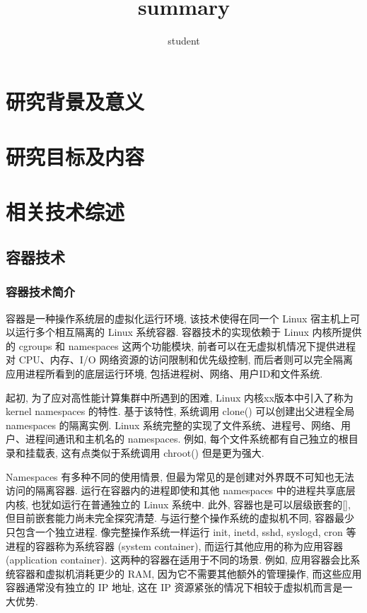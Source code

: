\documentclass[UTF8,a4paper]{ctexart}
\begin{document}
\title{summary}
\date{\vspace{-5ex}}
\author{student}
\maketitle
\thispagestyle{empty}
\newpage

\tableofcontents
\setcounter{page}{0}
\thispagestyle{empty}
\newpage

\section{研究背景及意义}

\section{研究目标及内容}

\section{相关技术综述}
\subsection{容器技术}
\subsubsection{容器技术简介}
容器是一种操作系统层的虚拟化运行环境, 该技术使得在同一个 Linux 宿主机上可以运行多个相互隔离的 Linux 系统容器. 容器技术的实现依赖于 Linux 内核所提供的 cgroups 和 namespaces 这两个功能模块, 前者可以在无虚拟机情况下提供进程对 CPU、内存、I/O 网络资源的访问限制和优先级控制, 而后者则可以完全隔离应用进程所看到的底层运行环境, 包括进程树、网络、用户ID和文件系统.

起初, 为了应对高性能计算集群中所遇到的困难\cite{Biderman2006}, Linux 内核xx版本中引入了称为 kernel namespaces 的特性. 基于该特性, 系统调用 clone() 可以创建出父进程全局 namespaces 的隔离实例. Linux 系统完整的实现了文件系统、进程号、网络、用户、进程间通讯和主机名的 namespaces. 例如, 每个文件系统都有自己独立的根目录和挂载表, 这有点类似于系统调用 chroot() 但是更为强大.

Namespaces 有多种不同的使用情景, 但最为常见的是创建对外界既不可知也无法访问的隔离容器. 运行在容器内的进程即使和其他 namespaces 中的进程共享底层内核, 也犹如运行在普通独立的 Linux 系统中. 此外, 容器也是可以层级嵌套的[], 但目前嵌套能力尚未完全探究清楚. 与运行整个操作系统的虚拟机不同, 容器最少只包含一个独立进程. 像完整操作系统一样运行 init, inetd, sshd, syslogd, cron 等进程的容器称为系统容器 (system container), 而运行其他应用的称为应用容器 (application container). 这两种的容器在适用于不同的场景. 例如, 应用容器会比系统容器和虚拟机消耗更少的 RAM, 因为它不需要其他额外的管理操作, 而这些应用容器通常没有独立的 IP 地址, 这在 IP 资源紧张的情况下相较于虚拟机而言是一大优势.
\end{document}
